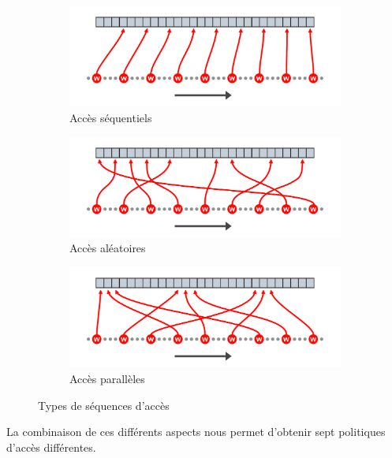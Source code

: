 \begin{figure}[h!]
	\centering
	\begin{subfigure}{0.65\linewidth}
		\includegraphics[width=\linewidth]{graphics/figures/sequence-linear.pdf}
		\caption{\label{fig:seq-linear}Accès séquentiels}
	\end{subfigure}
	\begin{subfigure}{0.65\linewidth}
		\includegraphics[width=\linewidth]{graphics/figures/sequence-random.pdf}
		\caption{\label{fig:seq-random}Accès aléatoires}
	\end{subfigure}
	\begin{subfigure}{0.65\linewidth}
		\includegraphics[width=\linewidth]{graphics/figures/sequence-parallel.pdf}
		\caption{\label{fig:seq-parallel}Accès parallèles}
	\end{subfigure}
	\caption{Types de séquences d'accès}
\end{figure}

La combinaison de ces différents aspects nous permet d'obtenir sept politiques d'accès différentes.

